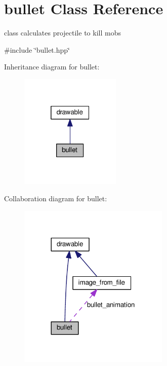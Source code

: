 \hypertarget{classbullet}{}\section{bullet Class Reference}
\label{classbullet}


class calculates projectile to kill mobs  




{\ttfamily \#include \char`\"{}bullet.\+hpp\char`\"{}}



Inheritance diagram for bullet\+:\nopagebreak
\begin{figure}[H]
\begin{center}
\leavevmode
\includegraphics[width=136pt]{classbullet__inherit__graph}
\end{center}
\end{figure}


Collaboration diagram for bullet\+:\nopagebreak
\begin{figure}[H]
\begin{center}
\leavevmode
\includegraphics[width=204pt]{classbullet__coll__graph}
\end{center}
\end{figure}
